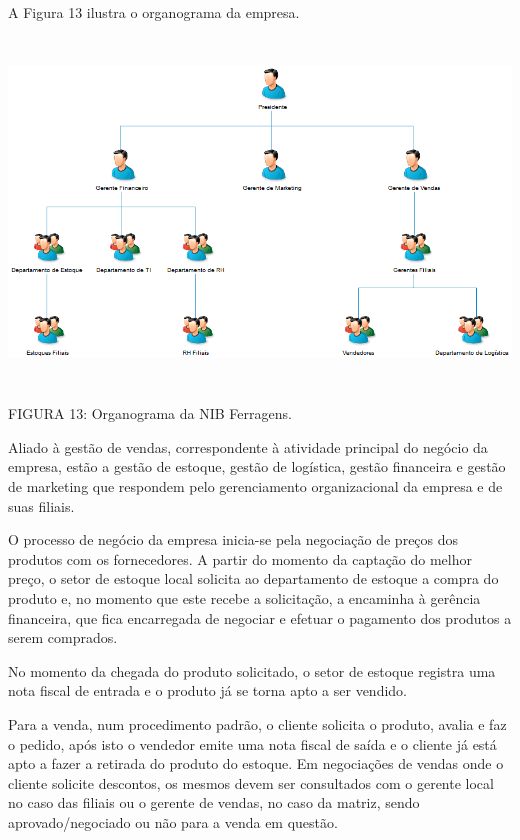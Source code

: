 \documentclass[a4paper]{article}
\begin{document}
{
\textsf{A Figura 13 ilustra o organograma da empresa.}}


\bigskip

 \includegraphics[width=15.981cm,height=9.234cm]{monograph-img013.png} 

{
\textsf{\MakeUppercase{\newline
FIGURA }}\textsf{13: Organograma da NIB Ferragens. }}


\bigskip

{
\textsf{Aliado \`a gest\~ao de vendas, correspondente \`a atividade principal do neg\'ocio da empresa, est\~ao a
gest\~ao de estoque, gest\~ao de log\'istica, gest\~ao financeira e gest\~ao de marketing que respondem pelo
gerenciamento organizacional da empresa e de suas filiais.}}

{\sffamily
O processo de neg\'ocio da empresa inicia-se pela negocia\c{c}\~ao de pre\c{c}os dos produtos com os fornecedores. A
partir do momento da capta\c{c}\~ao do melhor pre\c{c}o, o setor de estoque local solicita ao departamento de estoque a
compra do produto e, no momento que este recebe a solicita\c{c}\~ao, a encaminha \`a ger\^encia financeira, que fica
encarregada de negociar e efetuar o pagamento dos produtos a serem comprados.}

{
\textsf{No momento da chegada do produto solicitado, o setor de estoque registra uma nota fiscal de entrada e o produto
j\'a se torna apto a ser vendido.}}

{\sffamily
Para a venda, num procedimento padr\~ao, o cliente solicita o produto, avalia e faz o pedido, ap\'os isto o vendedor
emite uma nota fiscal de sa\'ida e o cliente j\'a est\'a apto a fazer a retirada do produto do estoque. Em
negocia\c{c}\~oes de vendas onde o cliente solicite descontos, os mesmos devem ser consultados com o gerente local no
caso das filiais ou o gerente de vendas, no caso da matriz, sendo aprovado/negociado ou n\~ao para a venda em
quest\~ao.}
\end{document}
